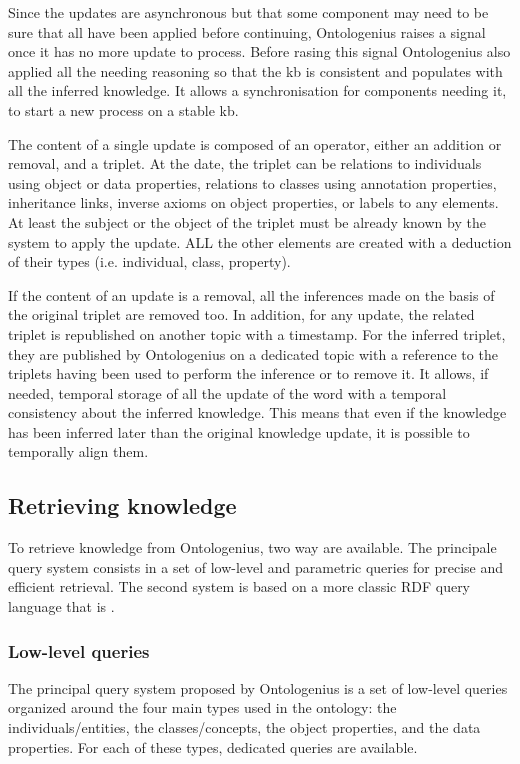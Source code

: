 Since the updates are asynchronous but that some component may need to be sure that all have been applied before continuing, Ontologenius raises a signal once it has no more update to process. Before rasing this signal Ontologenius also applied all the needing reasoning so that the \acrshort{kb} is consistent and populates with all the inferred knowledge. It allows a synchronisation for components needing it, to start a new process on a stable \acrshort{kb}.

The content of a single update is composed of an operator, either an addition or removal, and a triplet. At the date, the triplet can be relations to individuals using object or data properties, relations to classes using annotation properties, inheritance links, inverse axioms on object properties, or labels to any elements. At least the subject or the object of the triplet must be already known by the system to apply the update. ALL the other elements are created with a deduction of their types (i.e. individual, class, property).

If the content of an update is a removal, all the inferences made on the basis of the original triplet are removed too. In addition, for any update, the related triplet is republished on another topic with a timestamp. For the inferred triplet, they are published by Ontologenius on a dedicated topic with a reference to the triplets having been used to perform the inference or to remove it. It allows, if needed, temporal storage of all the update of the word with a temporal consistency about the inferred knowledge. This means that even if the knowledge has been inferred later than the original knowledge update, it is possible to temporally align them.

\subsection{Retrieving knowledge}

To retrieve knowledge from Ontologenius, two way are available. The principale query system consists in a set of low-level and parametric queries for precise and efficient retrieval. The second system is based on a more classic RDF query language that is \sparql{}.

\subsubsection{Low-level queries}

The principal query system proposed by Ontologenius is a set of low-level queries organized around the four main types used in the ontology: the individuals/entities, the classes/concepts, the object properties, and the data properties. For each of these types, dedicated queries are available.

